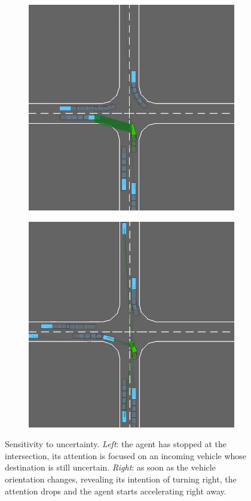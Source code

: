 \documentclass{article}
\begin{document}
\begin{figure}[tp]
	\centering
	\begin{subfigure}[t]{.4\linewidth}
		\includegraphics[width=\linewidth]{img/watch1}
	\end{subfigure}
	\begin{subfigure}[t]{.4\linewidth}
		\includegraphics[width=\linewidth]{img/watch2}
	\end{subfigure}
	\caption{Sensitivity to uncertainty. \emph{Left}: the agent has stopped at the intersection, its attention is focused on an incoming vehicle whose destination is still uncertain. \emph{Right}: as soon as the vehicle orientation changes, revealing its intention of turning right, the attention drops and the agent starts accelerating right away.}
	\label{fig:sensitivity}
\end{figure}
\end{document}
